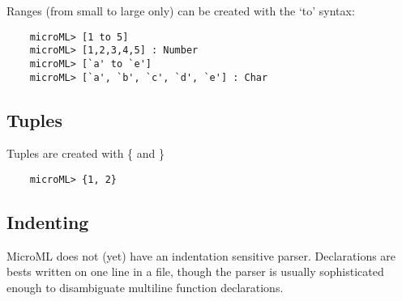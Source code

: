 Ranges (from small to large only) can be created with the `to' syntax:

\begin{verbatim}
    microML> [1 to 5]
    microML> [1,2,3,4,5] : Number
    microML> [`a' to `e'] 
    microML> [`a', `b', `c', `d', `e'] : Char
\end{verbatim}

\subsection{Tuples}
Tuples are created with \{  and \}

\begin{verbatim}
    microML> {1, 2}
\end{verbatim}

\subsection{Indenting}
MicroML does not (yet) have an indentation sensitive parser. Declarations are bests written on one
line in a file, though the parser is usually sophisticated enough to disambiguate multiline function
declarations.
